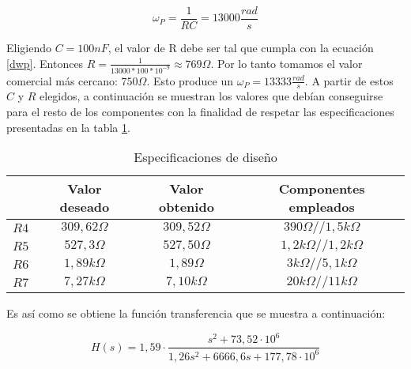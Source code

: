 \begin{equation}
	\omega_P = \frac{1}{RC} = 13000\frac{rad}{s}
	\label{dwp}
\end{equation}

Eligiendo $C = 100nF$, el valor de R debe ser tal que cumpla con la ecuaci\'on \ref{dwp}. Entonces $R = \frac{1}{13000 * 100 *10^{-9}} \approx 769\Omega.$ Por lo tanto tomamos el valor comercial m\'as cercano: $750\Omega$. Esto produce un $\omega_P = 13333 \frac{rad}{s}$. A partir de estos $C$ y $R$ elegidos, a continuaci\'on se muestran los valores que deb\'ian conseguirse para el resto de los componentes con la finalidad de respetar las especificaciones presentadas en la tabla \ref{especificaciones}.

\begin{table}[H]
	\centering
	\begin{tabular}{c c c c}%
		\bfseries  & Valor deseado & Valor obtenido& Componentes empleados \\ \hline
		$R4$ & $309,62\Omega$  & $309,52\Omega$ & $390\Omega // 1,5k\Omega$\\
			$R5$ & $527,3\Omega$  & $527,50\Omega$ & $1,2k\Omega // 1,2k\Omega$\\
				$R6$ & $1,89k\Omega$  & $1,89\Omega$ & $3k\Omega // 5,1k\Omega$\\
				$R7$ & $7,27k\Omega$  & $7,10k\Omega$ & $20k\Omega // 11k\Omega$\\
		\hline
	\end{tabular}
	\caption{Especificaciones de dise\~no}
	\label{especificaciones}
\end{table}

Es as\'i como se obtiene la funci\'on transferencia que se muestra a continuaci\'on:

\begin{equation}
H(s) = 1,59 \cdot \frac{s^2+73,52 \cdot 10^6}{1,26 s^2 + 6666,6 s + 177,78 \cdot 10^6}
\label{vovi_val}
\end{equation}

